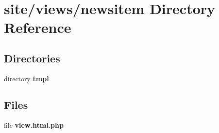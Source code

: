 \section{site/views/newsitem Directory Reference}
\label{dir_13f5056cf3b8256ebe724999515e4559}
\subsection*{Directories}
\begin{DoxyCompactItemize}
\item 
directory \textbf{ tmpl}
\end{DoxyCompactItemize}
\subsection*{Files}
\begin{DoxyCompactItemize}
\item 
file \textbf{ view.\+html.\+php}
\end{DoxyCompactItemize}
